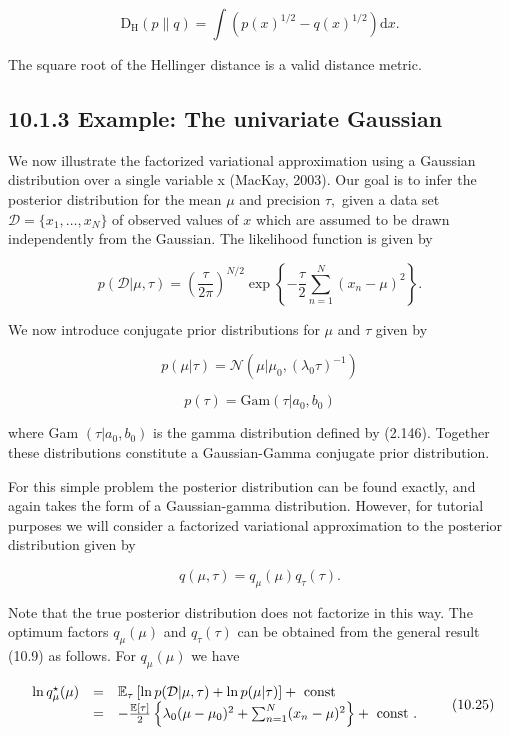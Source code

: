 \documentclass[
  10
]{article}
\begin{document}
\[
\mathrm{D} _ {\mathrm{H}} (p \| q) = \int \left(p (x) ^ {1 / 2} - q (x) ^ {1 / 2}\right) \mathrm{d} x.\tag{10.20}
\]

The square root of the Hellinger distance is a valid distance metric.

\subsection{10.1.3 Example: The univariate
Gaussian}\label{example-the-univariate-gaussian}

We now illustrate the factorized variational approximation using a
Gaussian distribution over a single variable x (MacKay, 2003). Our goal
is to infer the posterior distribution for the mean \(\mu\) and
precision \(\tau ,\) given a data set
\(\mathcal { D } = \{ x _ { 1 } , \ldots , x _ { N } \}\) of observed
values of \(x\) which are assumed to be drawn independently from the
Gaussian. The likelihood function is given by

\[
p (\mathcal {D} | \mu , \tau) = \left(\frac {\tau}{2 \pi}\right) ^ {N / 2} \exp \left\{- \frac {\tau}{2} \sum_ {n = 1} ^ {N} (x _ {n} - \mu) ^ {2} \right\}.\tag{10.21}
\]

We now introduce conjugate prior distributions for \(\mu\) and \(\tau\)
given by

\[
p (\mu | \tau) = \mathcal {N} \left(\mu | \mu_ {0}, (\lambda_ {0} \tau) ^ {- 1}\right)\tag{10.22}
\]

\[
{p (\tau)} = {\mathrm{Gam} (\tau | a _ {0}, b _ {0})}\tag{10.23}
\]

where Gam \(( \tau | a _ { 0 } , b _ { 0 } )\) is the gamma distribution
defined by (2.146). Together these distributions constitute a
Gaussian-Gamma conjugate prior distribution.

For this simple problem the posterior distribution can be found exactly,
and again takes the form of a Gaussian-gamma distribution. However, for
tutorial purposes we will consider a factorized variational
approximation to the posterior distribution given by

\[
q (\mu , \tau) = q _ {\mu} (\mu) q _ {\tau} (\tau).\tag{10.24}
\]

Note that the true posterior distribution does not factorize in this
way. The optimum factors \(q _ { \mu } ( \mu )\) and
\(q _ { \tau } ( \tau )\) can be obtained from the general result (10.9)
as follows. For \(q _ { \mu } ( \mu )\) we have

\[
\begin{array}{r c l} \ln q _ {\mu} ^ {\star} (\mu) & = & \mathbb {E} _ {\tau} \left[ \ln p (\mathcal {D} | \mu , \tau) + \ln p (\mu | \tau) \right] + \text { const } \\ & = & - \frac {\mathbb {E} [ \tau ]}{2} \left\{\lambda_ {0} (\mu - \mu_ {0}) ^ {2} + \sum_ {n = 1} ^ {N} (x _ {n} - \mu) ^ {2} \right\} + \text { const }. \end{array}\tag{10.25}
\]
\end{document}
